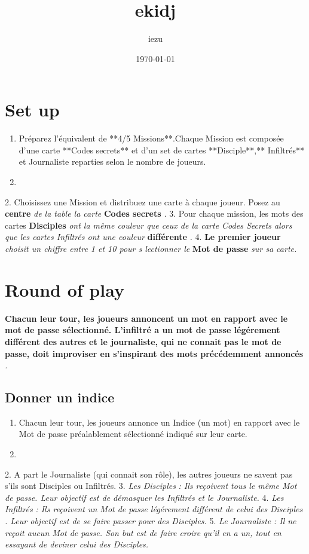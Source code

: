 \documentclass{article}%
\title{ekidj}%
\author{iezu}%
\date{\today}%
\begin{document}
%
\pagestyle{empty}%
\normalsize%
\maketitle%
\section{ Set up
}%
\label{sec:Setup}%
\begin{enumerate}%
\item%
 Préparez l'équivalent de **4/5 Missions**.Chaque Mission est composée d'une carte **Codes secrets** et d'un set de cartes **Disciple**,** Infiltrés** et Journaliste reparties selon le nombre de joueurs.
%
\item%
%
\end{enumerate}%
2. Choisissez une Mission et distribuez une carte à chaque joueur. Posez au %
\textbf{centre}%
\textit{ de la table la carte }%
\textbf{Codes secrets}%
\textit{.
}%
3. Pour chaque mission, les mots des cartes %
\textbf{Disciples}%
\textit{ ont la même couleur que ceux de la carte Codes Secrets alors que les cartes Infiltrés ont une couleur }%
\textbf{différente}%
\textit{.
}%
4. %
\textbf{Le premier joueur}%
\textit{ choisit un chiffre entre 1 et 10 pour s lectionner le }%
\textbf{Mot de passe}%
\textit{ sur sa carte.
}

%
\section{ Round of play
}%
\label{sec:Roundofplay}%
\textbf{Chacun leur tour, les joueurs annoncent un mot en rapport avec le mot de passe sélectionné. L'infiltré a un mot de passe légérement différent des autres et le journaliste, qui ne connait pas le mot de passe, doit improviser en s'inspirant des mots précédemment annoncés}%
\textit{.
}

%
\subsection{ Donner un indice
}%
\label{subsec:Donnerunindice}%
\begin{enumerate}%
\item%
 Chacun leur tour, les joueurs annonce un Indice (un mot) en rapport avec le Mot de passe préalablement sélectionné indiqué sur leur carte.
%
\item%
%
\end{enumerate}%
2. A part le Journaliste (qui connait son rôle), les autres joueurs ne savent pas s'ils sont Disciples ou Infiltrés.
%
3. %
\textit{Les Disciples}%
\textit{ : Ils reçoivent tous le même Mot de passe. Leur objectif est de démasquer les Infiltrés et le Journaliste.
}%
4. %
\textit{Les Infiltrés}%
\textit{ : Ils reçoivent un Mot de passe légérement différent de celui des }%
\textit{Disciples}%
\textit{. Leur objectif est de se faire passer pour des Disciples.
}%
5. %
\textit{Le Journaliste}%
\textit{ : Il ne reçoit aucun Mot de passe. Son but est de faire croire qu'il en a un, tout en essayant de deviner celui des Disciples.
}
\end{document}
